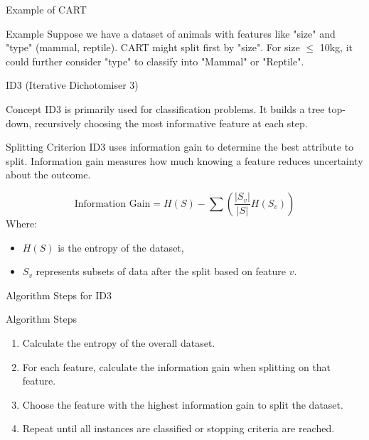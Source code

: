 \documentclass[aspectratio=169]{beamer}
\begin{document}
\begin{frame}[fragile]{Example of CART}
    \begin{block}{Example}
        Suppose we have a dataset of animals with features like "size" and "type" (mammal, reptile). 
        CART might split first by "size". For size $\leq$ 10kg, it could further consider "type" to classify into "Mammal" or "Reptile".
    \end{block}
\end{frame}

\begin{frame}[fragile]{ID3 (Iterative Dichotomiser 3)}
    \begin{block}{Concept}
        ID3 is primarily used for classification problems. 
        It builds a tree top-down, recursively choosing the most informative feature at each step.
    \end{block}

    \begin{block}{Splitting Criterion}
        ID3 uses information gain to determine the best attribute to split. 
        Information gain measures how much knowing a feature reduces uncertainty about the outcome.
    \end{block}

    \begin{equation}
        \text{Information Gain} = H(S) - \sum \left( \frac{|S_v|}{|S|} H(S_v) \right)
    \end{equation}
    Where:
    \begin{itemize}
        \item $H(S)$ is the entropy of the dataset,
        \item $S_v$ represents subsets of data after the split based on feature $v$.
    \end{itemize}
\end{frame}

\begin{frame}[fragile]{Algorithm Steps for ID3}
    \begin{block}{Algorithm Steps}
        \begin{enumerate}
            \item Calculate the entropy of the overall dataset.
            \item For each feature, calculate the information gain when splitting on that feature.
            \item Choose the feature with the highest information gain to split the dataset.
            \item Repeat until all instances are classified or stopping criteria are reached.
        \end{enumerate}
    \end{block}
\end{frame}
\end{document}
